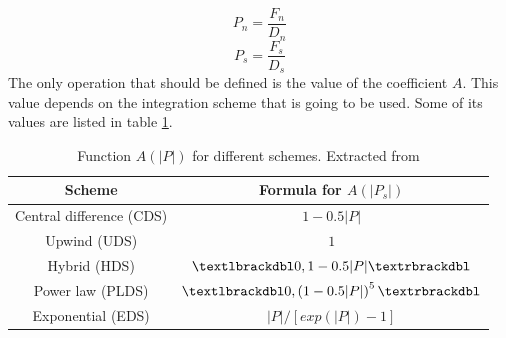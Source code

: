 \begin{equation}
P_{n}=\frac{F_{n}}{D_{n}}
\end{equation}
\begin{equation}
P_{s}=\frac{F_{s}}{D_{s}}
\end{equation}
The only operation that should be defined is the value of the coefficient $A$. This value depends on the integration scheme that is going to be used. Some of its values are listed in table \ref{Patankarvalues}.
\begin{table}[h]
	\centering
	\begin{tabular}{ |c|c| }
		\hline
		Scheme & Formula for $A\left(|P_{s}|\right)$ \\ \hline
		Central difference (CDS) & $1-0.5|P|$ \\ \hline
		Upwind (UDS) & $1$ \\ \hline
		Hybrid (HDS) & $\textlbrackdbl0,1-0.5|P|\textrbrackdbl$ \\ \hline
		Power law (PLDS) & $\textlbrackdbl0,\left(1-0.5|P|\right)^{5}\textrbrackdbl$ \\ \hline
		Exponential (EDS) & $|P|/\left[exp\left(|P|\right)-1\right]$ \\ \hline
	\end{tabular}
	\caption[Function $A(|P|)$ for different schemes]{Function $A(|P|)$ for different schemes. Extracted from \cite{Patankar1980}}
	\label{Patankarvalues}
\end{table}